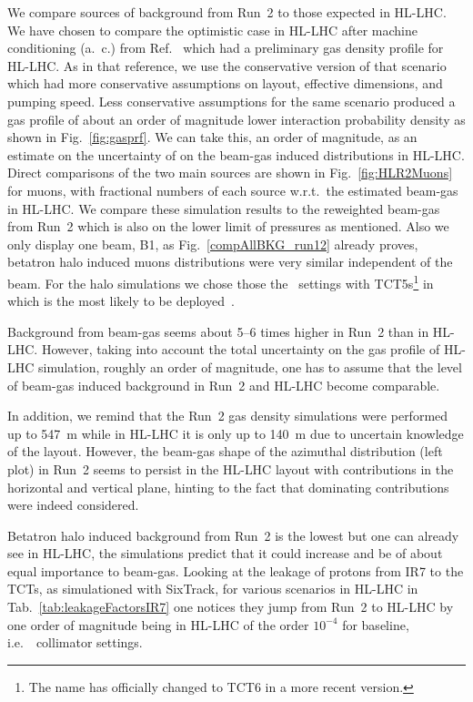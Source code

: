 We compare sources of background from Run~2 to those expected in HL-LHC. We have chosen to compare the optimistic case in HL-LHC after machine conditioning (a.~c.) from Ref.~\cite{ipac2015_rkh} which had a preliminary gas density profile for HL-LHC. As in that reference, we use the conservative version of that scenario which had more conservative assumptions on layout, effective dimensions, and pumping speed. Less conservative assumptions for the same scenario produced a gas profile of about an order of magnitude lower interaction probability density as shown in Fig.~\ref{fig:gasprf}. We can take this, an order of magnitude, as an estimate on the uncertainty of on the beam-gas induced distributions in HL-LHC. Direct comparisons of the two main sources are shown in Fig.~\ref{fig:HLR2Muons} for muons, with fractional numbers of each source w.r.t.~the estimated beam-gas in HL-LHC. We compare these simulation results to the reweighted beam-gas from Run~2 which is also on the lower limit of pressures as mentioned. Also we only display one beam, B1, as Fig.~\ref{compAllBKG_run12} already proves, betatron halo induced muons distributions were very similar independent of the beam. For the halo simulations we chose those the \twosigmaret~settings with TCT5s\footnote{The name has officially changed to TCT6 in a more recent version.} in which is the most likely to be deployed~\cite{layoutProcRod}.

Background from beam-gas seems about 5--6 times higher in Run~2 than in HL-LHC. However, taking into account the total uncertainty on the gas profile of HL-LHC simulation, roughly an order of magnitude, one has to assume that the level of beam-gas induced background in Run~2 and HL-LHC become comparable.

In addition, we remind that the Run~2 gas density simulations were performed up to 547~m while in HL-LHC it is only up to 140~m due to uncertain knowledge of the layout. However, the beam-gas shape of the azimuthal distribution (left plot) in Run~2 seems to persist in the HL-LHC layout with contributions in the horizontal and vertical plane, hinting to the fact that dominating contributions were indeed considered.

Betatron halo induced background from Run~2 is the lowest but one can already see in HL-LHC, the simulations predict that it could increase and be of about equal importance to beam-gas. Looking at the leakage of protons from IR7 to the TCTs, as simulationed with SixTrack, for various scenarios in HL-LHC in Tab.~\ref{tab:leakageFactorsIR7} one notices they jump from Run~2 to HL-LHC by one order of magnitude being in HL-LHC of the order $10^{-4}$ for baseline, i.e.~\twosigmaret~collimator settings. 

